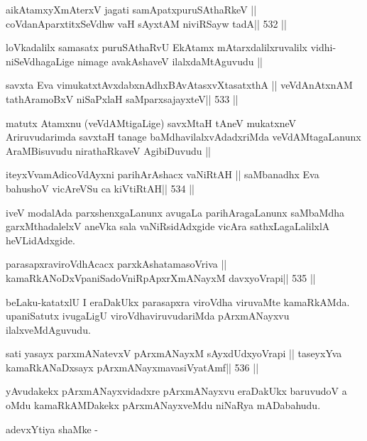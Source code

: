 \begin{shl}
aikAtamxyXmAterxV jagati samApatxpuruSAthaRkeV ||
coVdanAparxtitxSeVdhw vaH sAyxtAM niviRSayw tadA\hfill || 532 ||
\end{shl}

\begin{artha}
loVkadalilx samasatx puruSAthaRvU EkAtamx mAtarxdalilxruvalilx
vidhi-niSeVdhagaLige nimage avakAshaveV ilalxdaMtAguvudu ||
\end{artha}

\begin{shl}
savxta Eva vimukatxtAvxdabxnAdhxBAvAtasxvXtasatxthA ||
veVdAnAtxnAM tathA\s\s ramoBxV niSaPxlaH saMparxsajayxteV\hfill || 533 ||
\end{shl}

\begin{artha}
matutx Atamxnu (veVdAMtigaLige) savxMtaH tAneV mukatxneV
Ariruvudarimda savxtaH tanage baMdhavilalxvAdadxriMda veVdAMtagaLanunx
AraMBisuvudu nirathaRkaveV AgibiDuvudu ||
\end{artha}

\begin{shl}
iteyxVvamAdicoVdAyxni parihArAshacx vaNiRtAH ||
saMbanadhx Eva bahushoV vicAreVSu ca kiVtiRtAH\hfill || 534 ||
\end{shl}

\begin{artha}
iveV modalAda parxshenxgaLanunx avugaLa parihAragaLanunx saMbaMdha
garxMthadalelxV aneVka sala vaNiRsidAdxgide vicAra sathxLagaLalilxlA heVLidAdxgide.
\end{artha}

\begin{shl}
parasapxraviroVdhAcacx parxkAshatamasoVriva ||
kamaRkANoDxVpaniSadoVniRpApxrXmANayxM davxyoVrapi\hfill || 535 ||
\end{shl}

\begin{artha}
beLaku-katatxlU I eraDakUkx parasapxra viroVdha viruvaMte
kamaRkAMda. upaniSatutx ivugaLigU viroVdhaviruvudariMda pArxmANayxvu ilalxveMdAguvudu.
\end{artha}

\begin{shl}
sati yasayx parxmANatevxV pArxmANayxM sAyxdUdxyoVrapi ||
taseyxYva kamaRkANaDxsayx pArxmANayxmavasiVyatAmf\hfill || 536 ||
\end{shl}

\begin{artha}
yAvudakekx pArxmANayxvidadxre pArxmANayxvu eraDakUkx baruvudoV a oMdu
kamaRkAMDakekx pArxmANayxveMdu niNaRya mADabahudu.

adevxYtiya shaMke -
\end{artha}

